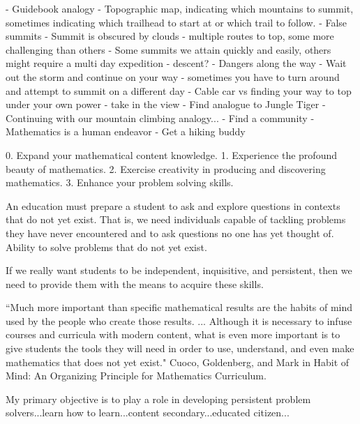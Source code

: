 - Guidebook analogy
- Topographic map, indicating which mountains to summit, sometimes indicating which trailhead to start at or which trail to follow. 
- False summits
- Summit is obscured by clouds
- multiple routes to top, some more challenging than others
- Some summits we attain quickly and easily, others might require a multi day expedition 
- descent?
- Dangers along the way
- Wait out the storm and continue on your way
- sometimes you have to turn around and attempt to summit on a different day
- Cable car vs finding your way to top under your own power
- take in the view
- Find analogue to Jungle Tiger
- Continuing with our mountain climbing analogy...
- Find a community 
- Mathematics is a human endeavor 
- Get a hiking buddy

0. Expand your mathematical content knowledge.
1. Experience the profound beauty of mathematics.
2. Exercise creativity in producing and discovering mathematics.
3. Enhance your problem solving skills.

An education must prepare a student to ask and explore questions in contexts that do not yet exist. That is, we need individuals capable of tackling problems they have never encountered and to ask questions no one has yet thought of. Ability to solve problems that do not yet exist.

If we really want students to be independent, inquisitive, and persistent, then we need to provide them with the means to acquire these skills.

 ``Much more important than specific mathematical results are the habits of mind used by the people who create those results. ... Although it is necessary to infuse courses and curricula with modern content, what is even more important is to give students the tools they will need in order to use, understand, and even make mathematics that does not yet exist."
Cuoco, Goldenberg, and Mark in Habit of Mind: An Organizing Principle for Mathematics Curriculum.

My primary objective is to play a role in developing persistent problem solvers...learn how to learn...content secondary...educated citizen...